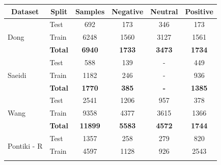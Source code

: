 \documentclass[12pt, a4paper]{report}
\theoremstyle{definition}
\theoremstyle{definition}%
\theoremstyle{definition}%
\theoremstyle{definition}%
\theoremstyle{definition}%
\theoremstyle{definition}%
\begin{document}
\begin{table}[]
\centering
\begin{tabular}{|l|l|c|ccc|}
\hline
\multicolumn{1}{|c|}{\textbf{Dataset}} & \multicolumn{1}{c|}{\textbf{Split}} & \textbf{Samples} & \textbf{Negative} & \textbf{Neutral} & \textbf{Positive} \\ \hline\hline
\multirow{3}{*}{Dong}                  & Test                                & 692              & 173               & 346              & 173               \\
                                       & Train                               & 6248             & 1560              & 3127             & 1561              \\ \cline{2-6} 
                                       & \textbf{Total}                      & \textbf{6940}    & \textbf{1733}     & \textbf{3473}    & \textbf{1734}     \\ \hline\hline
\multirow{3}{*}{Saeidi}                & Test                                & 588              & 139               & -                & 449               \\
                                       & Train                               & 1182             & 246               & -                & 936               \\ \cline{2-6} 
                                       & \textbf{Total}                      & \textbf{1770}    & \textbf{385}      & \textbf{-}       & \textbf{1385}     \\ \hline\hline
\multirow{3}{*}{Wang}                  & Test                                & 2541             & 1206              & 957              & 378               \\
                                       & Train                               & 9358             & 4377              & 3615             & 1366              \\ \cline{2-6} 
                                       & \textbf{Total}                      & \textbf{11899}   & \textbf{5583}     & \textbf{4572}    & \textbf{1744}     \\ \hline\hline
\multirow{3}{*}{Pontiki - R}           & Test                                & 1357             & 258               & 279              & 820               \\
                                       & Train                               & 4597             & 1128              & 926              & 2543              \\ \cline{2-6} 

\end{tabular}
\end{table}
\end{document}
